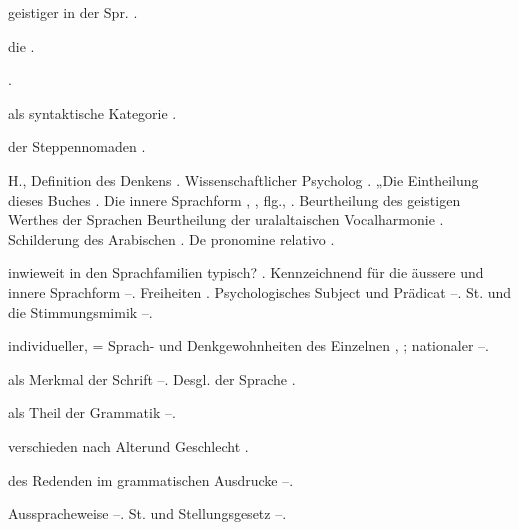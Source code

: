 \begin{register}
 geistiger in der Spr. \pageref{sp.325}.

 die \pageref{sp.237}.


 \pageref{sp.114}.

 als syntaktische Kategorie \pageref{sp.104}.


 der Steppennomaden \pageref{sp.127}.

 H., Definition des Denkens \pageref{sp.6}. Wissenschaftlicher Psycholog \pageref{sp.46}. „Die   Eintheilung dieses Buches \pageref{sp.86}. Die innere Sprachform \pageref{sp.150}, \pageref{sp.327}, \pageref{sp.335} flg., \pageref{sp.343}.  Beurtheilung des geistigen Werthes der Sprachen \pageref{sp.388} Beurtheilung der uralaltaischen Vocalharmonie \pageref{sp.402}. Schilderung des Arabischen \pageref{sp.409}. De pronomine relativo \pageref{sp.481}.

 inwieweit in den Sprachfamilien typisch? \pageref{sp.149}. Kennzeichnend für die äussere und innere Sprachform \pageref{sp.359}–\pageref{sp.360}. Freiheiten \pageref{sp.363}. Psychologisches Subject und Prädicat \pageref{sp.373}–\pageref{sp.376}. St. und die Stimmungsmimik \pageref{sp.380}–\pageref{sp.381}.

 individueller, = Sprach- und Denkgewohnheiten des Einzelnen \pageref{sp.98}, \pageref{sp.105}; nationaler \pageref{sp.105}–\pageref{sp.106}. 

 als Merkmal der Schrift \pageref{sp.128}–\pageref{sp.129}. Desgl. der Sprache \pageref{sp.315}.

 als Theil der Grammatik \pageref{sp.104}–\pageref{sp.106}. 

 verschieden nach Alterund Geschlecht \pageref{sp.311}.

 des Redenden im grammatischen Ausdrucke \pageref{sp.95}–\pageref{sp.96}.

 Ausspracheweise \pageref{sp.376}–\pageref{sp.380}. St. und Stellungsgesetz \pageref{sp.380}–\pageref{sp.381}.


\end{register}
